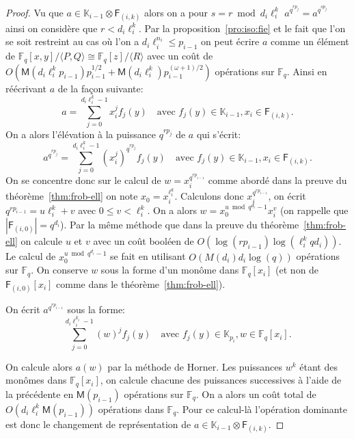 \documentclass[10pt,a4paper]{book}
\theoremstyle{plain}
\theoremstyle{definition}
\theoremstyle{definition}
\theoremstyle{definition}
\theoremstyle{definition}
\theoremstyle{remark}
\theoremstyle{remark}
\theoremstyle{definition}
\begin{document}
\begin{proof}
Vu que $a \in \mathbb{K}_{i-1} \otimes \mathsf{F}_{(i,k)}$ alors on a pour $s=r \bmod d_i \ell_i^{k}$ 
$a^{q^{r p_j}}=a^{q^{s p_j}}$ ainsi on considère que $r<d_i \ell_i^{k}$.
Par la proposition~\ref{pro:iso:fie} et le fait que l'on se soit restreint au 
cas où l'on a $d_i\ell_i^{n_i} \leqslant p_{i-1}$ on peut écrire $a$ comme un 
élément de 
$\mathbb{F}_q[x,y]/\langle P,Q \rangle \cong \mathbb{F}_q[z]/\langle R \rangle$
 avec un coût de 
 $O(\mathsf{M}(d_i\ell_i^{k}p_{i-1})p_{i-1}^{1/2}+\mathsf{M}(d_i\ell_i^{k})p_{i-1}^{(\omega+1)/2})$ 
 opérations sur $\mathbb{F}_q$.
Ainsi en réécrivant $a$ de la façon suivante:
\begin{equation*}
a=\sum_{j=0}^{d_i\ell_i^{k}-1}x_i^{j}f_{j}(y) \quad \text{avec } f_{j}(y) \in \mathbb{K}_{i-1}, x_i \in \mathsf{F}_{(i,k)}.
\end{equation*}
On a alors l'élévation à la puissance $q^{r p_j}$ de $a$ qui s'écrit:
\begin{equation*}
a^{q^{r p_j}}=\sum_{j=0}^{d_i\ell_i^{k}-1}(x_i^{j})^{q^{r p_j}}f_{j}(y) \quad \text{avec } f_{j}(y) \in \mathbb{K}_{i-1}, x_i \in \mathsf{F}_{(i,k)}.
\end{equation*} 
On se concentre donc sur le calcul de $w=x_i^{q^{r p_{i-1}}}$ comme abordé dans la 
preuve du théorème~\ref{thm:frob-ell} on note $x_0=x_i^{\ell_i^{k}}$. 
Calculons donc $x_i^{q^{r p_{i-1}}}$, on écrit $q^{r p_{i-1}}= u \ell_i^{k}+v$ avec 
$0 \leqslant v<\ell_i^{k}$. On a alors $w=x_0^{u \bmod q^{d_i}-1}x_i^{v}$ (on 
rappelle que $|\mathsf{F}_{(i,0)}|=q^{d_i}$). Par la même méthode que dans la 
preuve du théorème~\ref{thm:frob-ell} on calcule $u$ et $v$ avec un coût 
booléen de $O(\log(rp_{i-1})\log(\ell_i^{k}qd_i))$. Le calcul de $x_0^{u \bmod q^{d_i}-1}$ 
se fait en utilisant $O( M(d_i) d_i\log(q))$ opérations sur $\mathbb{F}_q$. On 
conserve $w$ sous la forme d'un monôme dans $\mathbb{F}_q[x_i]$ (et non de 
$\mathsf{F}_{(i,0)}[x_i]$ comme dans le théorème~\ref{thm:frob-ell}).

On écrit $a^{q^{r p_{i-1}}}$ sous la forme:
\begin{equation*}
\sum_{j=0}^{d_i\ell_i^{k_i}-1}(w)^{j}f_{j}(y) \quad \text{avec } f_{j}(y) \in \mathbb{K}_{p_i}, w \in \mathbb{F}_{q}[x_i].
\end{equation*}

On calcule alors $a(w)$ par la méthode de Horner. Les puissances $w^k$ étant 
des monômes dans $\mathbb{F}_q[x_i]$, on calcule chacune des puissances 
successives à l'aide de la précédente en $\mathsf{M}(p_{i-1})$ opérations sur 
$\mathbb{F}_q$. On a alors un coût total de 
$O(d_i\ell_i^{k}\mathsf{M}(p_{i-1}))$ opérations dans $\mathbb{F}_q$. 
Pour ce calcul-là l'opération dominante est donc le changement de 
représentation de $a \in \mathbb{K}_{i-1} \otimes \mathsf{F}_{(i,k)}$.
\end{proof}
\end{document}
